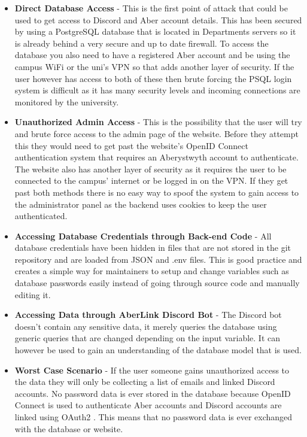 \begin{itemize}
	\item \textbf{Direct Database Access} - This is the first point of attack that could be used to get access to Discord and Aber account details. This has been secured by using a PostgreSQL \cite{psql} database that is located in Departments servers so it is already behind a very secure and up to date firewall. To access the database you also need to have a registered Aber account and be using the campus WiFi or the uni's VPN so that adds another layer of security. If the user however has access to both of these then brute forcing the PSQL login system is difficult as it has many security levels and incoming connections are monitored by the university.
	\item \textbf{Unauthorized Admin Access} - This is the possibility that the user will try and brute force access to the admin page of the website. Before they attempt this they would need to get past the website's OpenID Connect \cite{OpenID} authentication system that requires an Aberystwyth account to authenticate. The website also has another layer of security as it requires the user to be connected to the campus' internet or be logged in on the VPN. If they get past both methods there is no easy way to spoof the system to gain access to the administrator panel as the backend uses cookies to keep the user authenticated.
	\item \textbf{Accessing Database Credentials through Back-end Code} - All database credentials have been hidden in files that are not stored in the git repository and are loaded from JSON and .env files. This is good practice and creates a simple way for maintainers to setup and change variables such as database passwords easily instead of going through source code and manually editing it.
	\item \textbf{Accessing Data through AberLink Discord Bot} - The Discord bot doesn't contain any sensitive data, it merely queries the database using generic queries that are changed depending on the input variable. It can however be used to gain an understanding of the database model that is used.
	\item \textbf{Worst Case Scenario} - If the user someone gains unauthorized access to the data they will only be collecting a list of emails and linked Discord accounts. No password data is ever stored in the database because  OpenID Connect \cite{OpenID} is used to authenticate Aber accounts and Discord accounts are linked using OAuth2 \cite{oauth2}. This means that no password data is ever exchanged with the database or website.
\end{itemize}

